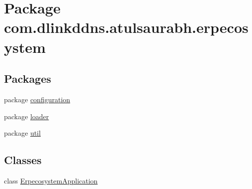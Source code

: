 \hypertarget{namespacecom_1_1dlinkddns_1_1atulsaurabh_1_1erpecosystem}{}\section{Package com.\+dlinkddns.\+atulsaurabh.\+erpecosystem}
\label{namespacecom_1_1dlinkddns_1_1atulsaurabh_1_1erpecosystem}
\subsection*{Packages}
\begin{DoxyCompactItemize}
\item 
package \mbox{\hyperlink{namespacecom_1_1dlinkddns_1_1atulsaurabh_1_1erpecosystem_1_1configuration}{configuration}}
\item 
package \mbox{\hyperlink{namespacecom_1_1dlinkddns_1_1atulsaurabh_1_1erpecosystem_1_1loader}{loader}}
\item 
package \mbox{\hyperlink{namespacecom_1_1dlinkddns_1_1atulsaurabh_1_1erpecosystem_1_1util}{util}}
\end{DoxyCompactItemize}
\subsection*{Classes}
\begin{DoxyCompactItemize}
\item 
class \mbox{\hyperlink{classcom_1_1dlinkddns_1_1atulsaurabh_1_1erpecosystem_1_1_erpecosystem_application}{Erpecosystem\+Application}}
\end{DoxyCompactItemize}

